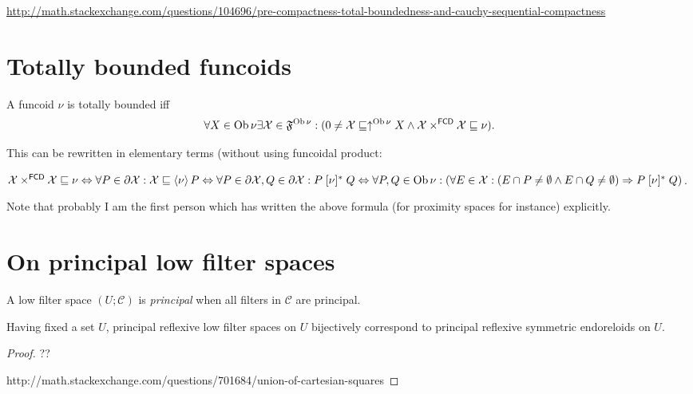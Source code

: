 \url{http://math.stackexchange.com/questions/104696/pre-compactness-total-boundedness-and-cauchy-sequential-compactness}

\section{Totally bounded funcoids}

\begin{defn}
  A funcoid $\nu$ is totally bounded iff
  \[ \forall X \in \operatorname{Ob} \nu \exists \mathcal{X} \in
     \mathfrak{F}^{\operatorname{Ob} \nu} : (0 \neq \mathcal{X} \sqsubseteq
     \uparrow^{\operatorname{Ob} \nu} X \wedge \mathcal{X}
     \times^{\mathsf{FCD}} \mathcal{X} \sqsubseteq \nu) . \]
\end{defn}

This can be rewritten in elementary terms (without using funcoidal product:

$\mathcal{X} \times^{\mathsf{FCD}} \mathcal{X} \sqsubseteq \nu
\Leftrightarrow \forall P \in \partial \mathcal{X} : \mathcal{X} \sqsubseteq
\left\langle \nu\right\rangle P \Leftrightarrow \forall P \in \partial \mathcal{X}, Q
\in \partial \mathcal{X} : P \mathrel{[\nu]^{\ast}} Q \Leftrightarrow \forall
P, Q \in \operatorname{Ob} \nu : \left( \forall E \in \mathcal{X} : (E \cap P \neq
\emptyset \wedge E \cap Q \neq \emptyset) \Rightarrow P \mathrel{[\nu]^{\ast}}
Q \right)$.

Note that probably I am the first person which has written the above formula
(for proximity spaces for instance) explicitly.

\section{On principal low filter spaces}

\begin{defn}
  A low filter space $\left( U ; \mathscr{C} \right)$ is \emph{principal}
  when all filters in $\mathscr{C}$ are principal.
\end{defn}

\begin{prop}
  Having fixed a set $U$, principal reflexive low filter spaces on $U$
  bijectively correspond to principal reflexive symmetric endoreloids on $U$.
\end{prop}

\begin{proof}
  ??
  
  http://math.stackexchange.com/questions/701684/union-of-cartesian-squares
\end{proof}

